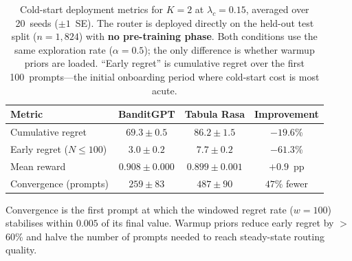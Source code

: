 
\begin{table}[htbp]
\centering
\small
\caption{Cold-start deployment metrics for $K{=}2$ at
$\lambda_c{=}0.15$, averaged over 20~seeds ($\pm 1$~SE).
The router is deployed directly on the held-out test split
($n{=}1{,}824$) with \textbf{no pre-training phase}.
Both conditions use the same exploration rate ($\alpha{=}0.5$);
the only difference is whether warmup priors are loaded.
``Early regret'' is cumulative regret over the first
100~prompts---the initial onboarding period where cold-start
cost is most acute.}
\label{tab:regret_reduction}
\begin{tabular}{lccc}
\toprule
Metric
  & BanditGPT
  & Tabula Rasa
  & Improvement \\
\midrule
  Cumulative regret
  & $69.3 \pm 0.5$
  & $86.2 \pm 1.5$
  & $-19.6$\% \\
  Early regret ($N{\leq}100$)
  & $3.0 \pm 0.2$
  & $7.7 \pm 0.2$
  & $\mathbf{-61.3}$\% \\
  Mean reward
  & $0.908 \pm 0.000$
  & $0.899 \pm 0.001$
  & $+0.9$~pp \\
  Convergence (prompts)
  & $259 \pm 83$
  & $487 \pm 90$
  & $47$\% fewer \\
\bottomrule
\end{tabular}

\vspace{2pt}
{\footnotesize
Convergence is the first prompt at which the windowed regret rate
($w{=}100$) stabilises within $0.005$ of its final value.
Warmup priors reduce early regret by $>$60\% and halve the
number of prompts needed to reach steady-state routing quality.}
\end{table}
